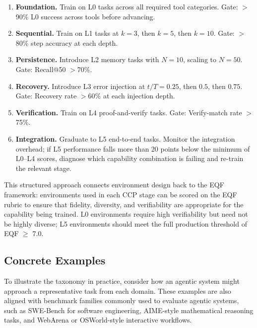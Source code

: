\begin{enumerate}[label=Stage \arabic*.]
    \item \textbf{Foundation.} Train on L0 tasks across all required tool categories. Gate: $>$90\% L0 success across tools before advancing.
    \item \textbf{Sequential.} Train on L1 tasks at $k = 3$, then $k = 5$, then $k = 10$. Gate: $>$80\% step accuracy at each depth.
    \item \textbf{Persistence.} Introduce L2 memory tasks with $N = 10$, scaling to $N = 50$. Gate: Recall@50 $>$70\%.
    \item \textbf{Recovery.} Introduce L3 error injection at $t/T = 0.25$, then $0.5$, then $0.75$. Gate: Recovery rate $>$60\% at each injection depth.
    \item \textbf{Verification.} Train on L4 proof-and-verify tasks. Gate: Verify-match rate $>$75\%.
    \item \textbf{Integration.} Graduate to L5 end-to-end tasks. Monitor the integration overhead; if L5 performance falls more than 20 points below the minimum of L0--L4 scores, diagnose which capability combination is failing and re-train the relevant stage.
\end{enumerate}

This structured approach connects environment design back to the EQF framework: environments used in each CCP stage can be scored on the EQF rubric to ensure that fidelity, diversity, and verifiability are appropriate for the capability being trained. L0 environments require high verifiability but need not be highly diverse; L5 environments should meet the full production threshold of EQF $\geq$ 7.0.

\subsection{Concrete Examples}

To illustrate the taxonomy in practice, consider how an agentic system might approach a representative task from each domain. These examples are also aligned with benchmark families commonly used to evaluate agentic systems, such as SWE-Bench for software engineering, AIME-style mathematical reasoning tasks, and WebArena or OSWorld-style interactive workflows.

